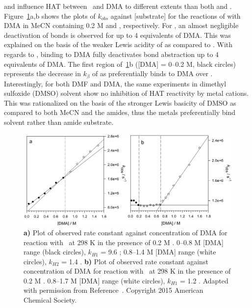  and  influence HAT between \cumo\ and DMA to different extents than both  and . Figure~\ref{fig:k-metals-naca}a,b shows the plots of $k_{obs}$ against [substrate] for the reactions of \cumo with DMA in MeCN containing 0.2 M  and , respectively. For , an almost negligible deactivation of  bonds is observed for up to 4 equivalents of DMA. This was explained on the basis of the weaker Lewis acidity of  as compared to . With regards to , binding to DMA fully deactivates  bond abstraction up to 4 equivalents of DMA. The first region of~\ref{fig:k-metals-naca}b ([DMA] = 0--0.2 M, black circles) represents the decrease in $k_\beta$ of \cumo as  preferentially binds to DMA over \cumo. Interestingly, for both DMF and DMA, the same experiments in dimethyl sulfoxide (DMSO) solvent show no inhibition of HAT reactivity by metal cations. This was rationalized on the basis of the stronger Lewis basicity of DMSO as compared to both MeCN and the amides, thus the metals preferentially bind solvent rather than amide substrate.

\begin{figure}[!htbp]
  \includegraphics[width=\textwidth]{figures/exptdma-na-ca.png}
  \caption[Plot of observed rate constant against concentration of DMA for reaction with \cumo\ at 298 K in the presence of 0.2 M  and .]
  {\textbf{a)} Plot of observed rate constant against concentration of DMA for reaction with \cumo\ at 298 K in the presence of 0.2 M . 0--0.8 M [DMA] range (black circles), $k_{H1}$ = 9.6 \Ms; 0.8--1.4 M [DMA] range (white circles), $k_{H2}$ = 1.4 \Ms.
  \textbf{b)} Plot of observed rate constant against concentration of DMA for reaction with \cumo\ at 298 K in the presence of 0.2 M . 0.8--1.7 M [DMA] range (white circles), $k_{H1}$ = 1.2 \Ms. Adapted with permission from Reference~\protect{}. Copyright 2015 American Chemical Society.}
  \label{fig:k-metals-naca}
\end{figure}

